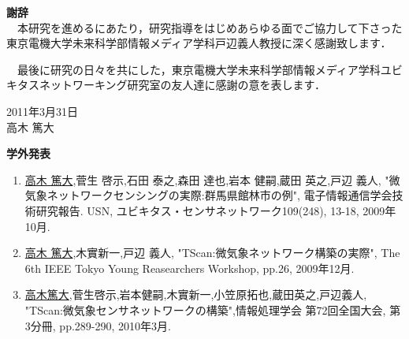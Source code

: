 \newpage

\begin{flushleft}
{\huge{\bf 謝辞}}\\
\vspace{1cm}
　本研究を進めるにあたり，研究指導をはじめあらゆる面でご協力して下さった東京電機大学未来科学部情報メディア学科戸辺義人教授に深く感謝致します．
\par
　最後に研究の日々を共にした，東京電機大学未来科学部情報メディア学科ユビキタスネットワーキング研究室の友人達に感謝の意を表します．\\

\vspace{3cm}
\begin{flushright}
2011年3月31日\\
高木 篤大\\
\end{flushright}
\end{flushleft}




\newpage



\begin{flushleft}
{\huge{\bf 学外発表}}\\
\vspace{1cm}
\begin{enumerate}
	
\item \underline{高木 篤大},菅生 啓示,石田 泰之,森田 達也,岩本 健嗣,蔵田 英之,戸辺 義人, "微気象ネットワークセンシングの実際:群馬県館林市の例", 電子情報通信学会技術研究報告. USN, ユビキタス・センサネットワーク109(248), 13-18, 2009年10月.
\item \underline{高木 篤大},木實新一,戸辺 義人, "TScan:微気象ネットワーク構築の実際", The 6th IEEE Tokyo Young Reasearchers Workshop, pp.26, 2009年12月.
\item \underline{高木篤大},菅生啓示,岩本健嗣,木實新一,小笠原拓也,蔵田英之,戸辺義人, "TScan:微気象センサネットワークの構築",情報処理学会 第72回全国大会, 第3分冊, pp.289-290, 2010年3月. 






\end{enumerate}
\end{flushleft}


